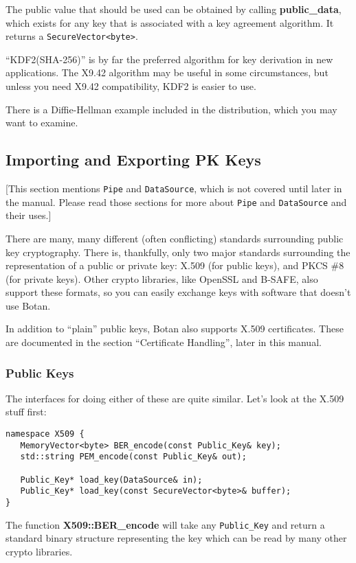 \documentclass{article}
\newcommand{\function}[1]{\textbf{#1}}
\newcommand{\type}[1]{\texttt{#1}}
\begin{document}
The public value that should be used can be obtained by calling
\function{public\_data}, which exists for any key that is associated with a
key agreement algorithm. It returns a \type{SecureVector<byte>}.

``KDF2(SHA-256)'' is by far the preferred algorithm for key derivation
in new applications. The X9.42 algorithm may be useful in some
circumstances, but unless you need X9.42 compatibility, KDF2 is easier
to use.

There is a Diffie-Hellman example included in the distribution, which you may
want to examine.

\subsection{Importing and Exporting PK Keys}

[This section mentions \type{Pipe} and \type{DataSource}, which is not covered
until later in the manual. Please read those sections for more about
\type{Pipe} and \type{DataSource} and their uses.]

There are many, many different (often conflicting) standards surrounding public
key cryptography. There is, thankfully, only two major standards surrounding
the representation of a public or private key: X.509 (for public keys), and
PKCS \#8 (for private keys). Other crypto libraries, like OpenSSL and B-SAFE,
also support these formats, so you can easily exchange keys with software that
doesn't use Botan.

In addition to ``plain'' public keys, Botan also supports X.509 certificates.
These are documented in the section ``Certificate Handling'', later in this
manual.

\subsubsection{Public Keys}

The interfaces for doing either of these are quite similar. Let's look at the
X.509 stuff first:
\begin{verbatim}
namespace X509 {
   MemoryVector<byte> BER_encode(const Public_Key& key);
   std::string PEM_encode(const Public_Key& out);

   Public_Key* load_key(DataSource& in);
   Public_Key* load_key(const SecureVector<byte>& buffer);
}
\end{verbatim}

The function \function{X509::BER\_encode} will take any
\type{Public\_Key} and return a standard binary structure representing
the key which can be read by many other crypto libraries.
\end{document}
